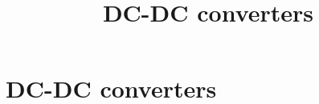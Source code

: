 \section{DC-DC converters}
\title{DC-DC converters}  

\begin{frame}[plain]
    \titlepage
\end{frame}
